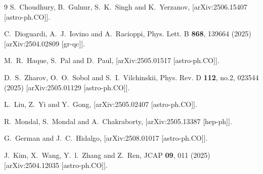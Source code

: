 \documentclass[aps,prev,twocolumn,preprintnumbers,floatfix,nofootinbib]{revtex4-1}
\begin{document}
\begin{thebibliography}{9}
S.~Choudhury, B.~Gulnur, S.~K.~Singh and K.~Yerzanov,
[arXiv:2506.15407 [astro-ph.CO]].


C.~Dioguardi, A.~J.~Iovino and A.~Racioppi,
Phys. Lett. B \textbf{868}, 139664 (2025)
[arXiv:2504.02809 [gr-qc]].


M.~R.~Haque, S.~Pal and D.~Paul,
[arXiv:2505.01517 [astro-ph.CO]].

D.~S.~Zharov, O.~O.~Sobol and S.~I.~Vilchinskii,
Phys. Rev. D \textbf{112}, no.2, 023544 (2025)
[arXiv:2505.01129 [astro-ph.CO]].


L.~Liu, Z.~Yi and Y.~Gong,
[arXiv:2505.02407 [astro-ph.CO]].

R.~Mondal, S.~Mondal and A.~Chakraborty,
[arXiv:2505.13387 [hep-ph]].

G.~German and J.~C.~Hidalgo,
[arXiv:2508.01017 [astro-ph.CO]].








J.~Kim, X.~Wang, Y.~l.~Zhang and Z.~Ren,
JCAP \textbf{09}, 011 (2025)
[arXiv:2504.12035 [astro-ph.CO]].



\end{thebibliography}
\end{document}
